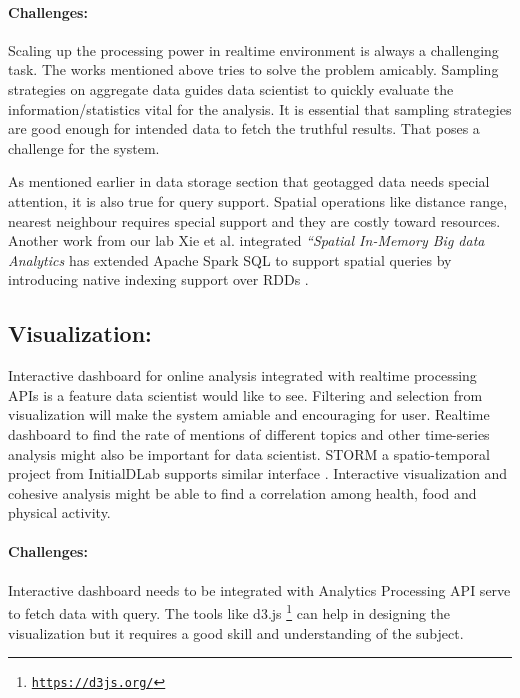 \vspace{-2mm}
\paragraph{Challenges:}
Scaling up the processing power in realtime environment is always a challenging task. The works mentioned above tries to solve the problem amicably. Sampling strategies on aggregate data guides data scientist to quickly
evaluate the information/statistics vital for the analysis. It is essential that sampling strategies are good enough for intended data to fetch the truthful results. That poses a challenge for the system.

As mentioned earlier in data storage section that geotagged data needs special attention, it is also true for query support.
Spatial operations like distance range, nearest neighbour requires special support and they are costly toward resources. Another work from our lab Xie et al. integrated {\em ``Spatial In-Memory Big data Analytics}  \cite{xie2016simba} has extended Apache Spark SQL to support spatial queries by introducing native indexing support over RDDs \cite{zaharia2012resilient}.

\subsection{Visualization:}
Interactive dashboard for online analysis integrated with realtime processing APIs is a feature data scientist would like to see. Filtering and selection from visualization will make the system amiable and encouraging for user. Realtime dashboard to find the rate of mentions of different topics and other time-series analysis might also be important for data scientist. STORM a spatio-temporal project from InitialDLab supports similar interface \cite{christensen2015storm}. Interactive visualization and cohesive analysis might be able to find a correlation among health, food and physical activity.

\vspace{-2mm}
\paragraph{Challenges:}
Interactive dashboard needs to be integrated with Analytics Processing API serve to fetch data with query. The tools like d3.js \footnote{\href{https://d3js.org/}{\texttt{https://d3js.org/}}} can help in designing the visualization but it requires a good skill and understanding of the subject.


